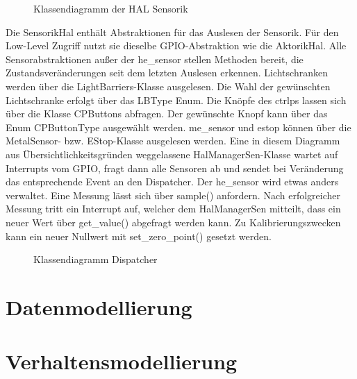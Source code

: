 \begin{figure}
    \caption{Klassendiagramm der HAL Sensorik}
    \label{fig:cd-hal-sens}
\end{figure}

Die Sensorik\-Hal enthält Abstraktionen für das Auslesen der Sensorik.
Für den Low-Level Zugriff nutzt sie dieselbe GPIO-Abstraktion wie die Aktorik\-Hal.
Alle Sensorabstraktionen außer der \gls{he_sensor} stellen Methoden bereit, die Zustandsveränderungen
seit dem letzten Auslesen erkennen.
Lichtschranken werden über die LightBarriers-Klasse ausgelesen.
Die Wahl der gewünschten Lichtschranke erfolgt über das LBType Enum.
Die Knöpfe des \gls{ctrlp}s lassen sich über die Klasse CPButtons abfragen.
Der gewünschte Knopf kann über das Enum CPButtonType ausgewählt werden.
\Gls{me_sensor} und \gls{estop} können über die MetalSensor- bzw. EStop-Klasse ausgelesen werden.
Eine in diesem Diagramm aus Übersichtlichkeitsgründen weggelassene HalManagerSen-Klasse wartet
auf Interrupts vom GPIO, fragt dann alle Sensoren ab und sendet bei Veränderung das entsprechende
Event an den Dispatcher.
Der \gls{he_sensor} wird etwas anders verwaltet. Eine Messung lässt sich über sample() anfordern.
Nach erfolgreicher Messung tritt ein Interrupt auf, welcher dem HalManagerSen mitteilt,
dass ein neuer Wert über get\_value() abgefragt werden kann.
Zu Kalibrierungszwecken kann ein neuer Nullwert mit set\_zero\_point() gesetzt werden.


\begin{figure}
    \caption{Klassendiagramm Dispatcher}
    \label{fig:cd-dispatcher}
\end{figure}


\section{Datenmodellierung}\label{sec:datenmodellierung}



\FloatBarrier
\section{Verhaltensmodellierung}\label{sec:verhaltensmodellierung}

